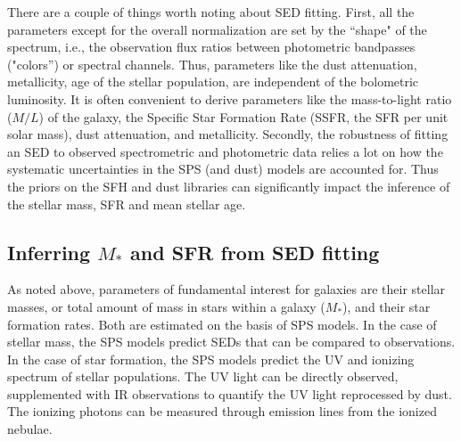 There are a couple of things worth noting about SED fitting.  First,
all the parameters except for the overall normalization are set by the
``shape" of the spectrum, i.e., the observation flux ratios between
photometric bandpasses ("colors'') or spectral channels.  Thus,
parameters like the dust attenuation, metallicity, age of the stellar
population, are independent of the bolometric luminosity. It is often
convenient to derive parameters like the mass-to-light ratio ($M/L$)
of the galaxy, the Specific Star Formation Rate (SSFR, the SFR per
unit solar mass), dust attenuation, and metallicity.  Secondly, the
robustness of fitting an SED to observed spectrometric and photometric
data relies a lot on how the systematic uncertainties in the SPS (and
dust) models are accounted for. Thus the priors on the SFH and dust
libraries can significantly impact the inference of the stellar mass,
SFR and mean stellar age.\\


\subsection{Inferring $M_{*}$ and SFR from SED fitting}
\label{masses}

As noted above, parameters of fundamental interest for galaxies are
their stellar masses, or total amount of mass in stars within a galaxy
($M_\ast$), and their star formation rates. Both are estimated on the
basis of SPS models. In the case of stellar mass, the SPS models
predict SEDs that can be compared to observations. In the case of star
formation, the SPS models predict the UV and ionizing spectrum of
stellar populations. The UV light can be directly observed,
supplemented with IR observations to quantify the UV light reprocessed
by dust. The ionizing photons can be measured through emission lines
from the ionized nebulae.\\

